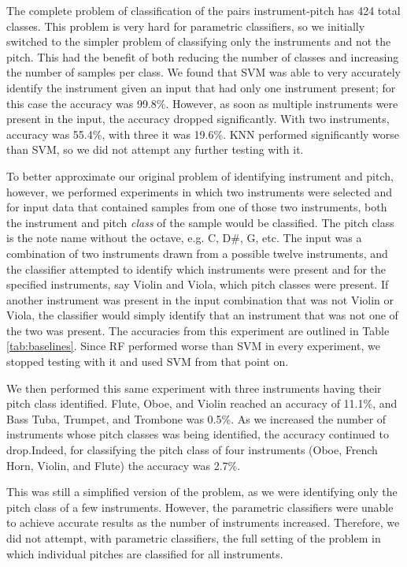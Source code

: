 \documentclass[runningheads,a4paper]{llncs}
\begin{document}
The complete problem of classification of the pairs instrument-pitch has 424 total classes. This problem is very hard for parametric classifiers, so we initially switched to the simpler problem of classifying only the instruments and not the pitch. This had the benefit of both reducing the number of classes and increasing the number of samples per class. We found that SVM was able to very accurately identify the instrument given an input that had only one instrument present; for this case the accuracy was 99.8\%. However, as soon as multiple instruments were present in the input, the accuracy dropped significantly. With two instruments, accuracy was 55.4\%, with three it was 19.6\%. KNN performed significantly worse than SVM, so we did not attempt any further testing with it.

To better approximate our original problem of identifying instrument and pitch, however, we performed experiments in which two instruments were selected and for input data that contained samples from one of those two instruments, both the instrument and pitch \emph{class} of the sample would be classified. The pitch class is the note name without the octave, e.g. C, D\#, G, etc. The input was a combination of two instruments drawn from a possible twelve instruments, and the classifier attempted to identify which instruments were present and for the specified instruments, say Violin and Viola, which pitch classes were present. If another instrument was present in the input combination that was not Violin or Viola, the classifier would simply identify that an instrument that was not one of the two was present. The accuracies from this experiment are outlined in Table \ref{tab:baselines}. Since RF performed worse than SVM in every experiment, we stopped testing with it and used SVM from that point on.

We then performed this same experiment with three instruments having their pitch class identified. Flute, Oboe, and Violin reached an accuracy of 11.1\%, and Bass Tuba, Trumpet, and Trombone was 0.5\%. As we increased the number of instruments whose pitch classes was being identified, the accuracy continued to drop.Indeed, for classifying the pitch class of four instruments (Oboe, French Horn, Violin, and Flute) the accuracy was 2.7\%.

This was still a simplified version of the problem, as we were identifying only the pitch class of a few instruments. However, the parametric classifiers were unable to achieve accurate results as the number of instruments increased. Therefore, we did not attempt, with parametric classifiers, the full setting of the problem in which individual pitches are classified for all instruments.
\end{document}
